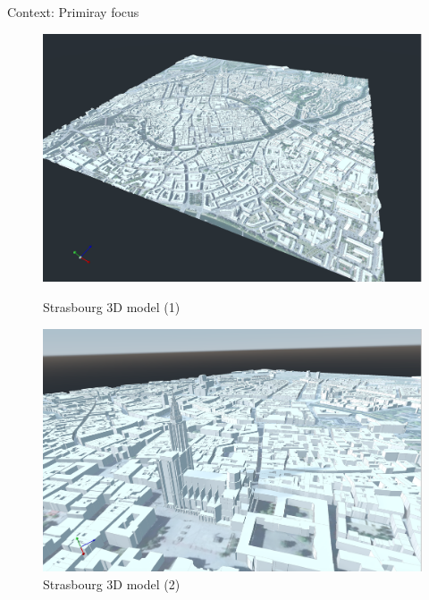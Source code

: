 \documentclass[10pt]{beamer}
\begin{document}
\begin{frame}{Context: Primiray focus}
  \begin{figure}[H]
    \centering
    \begin{minipage}{0.49\textwidth}
      \centering
      \includegraphics[width=\textwidth]{images/strasbourg-mesh-1.png}
      \caption{Strasbourg 3D model (1)}
    \end{minipage}
    \hfill
    \begin{minipage}{0.49\textwidth}
      \centering
      \includegraphics[width=\textwidth]{images/strasbourg-mesh-2.png}
      \caption{Strasbourg 3D model (2)}
    \end{minipage}
  \end{figure}
\end{frame}  
\end{document}
